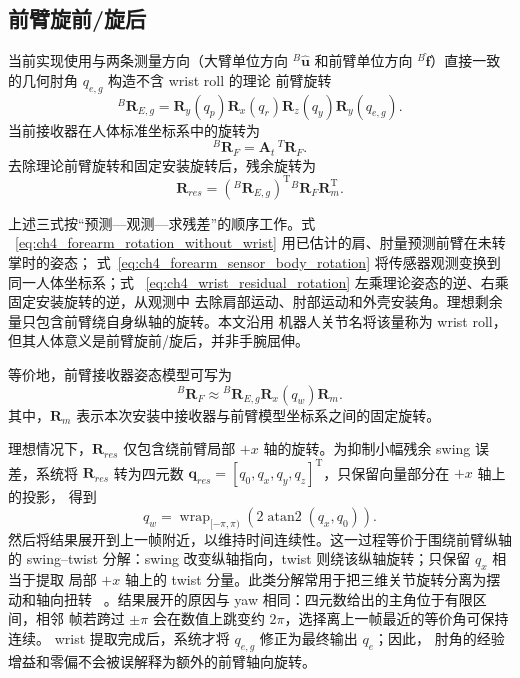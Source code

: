 \subsection{前臂旋前/旋后}
\label{subsec:ch4_forearm_pronation_supination}

当前实现使用与两条测量方向（大臂单位方向 ${}^{B}\hat{\boldsymbol u}$ 和前臂单位方向
${}^{B}\hat{\boldsymbol f}$）直接一致的几何肘角 $q_{e,g}$ 构造不含 wrist roll 的理论
前臂旋转
\begin{equation}
  {}^{B}\boldsymbol R_{E,g}=
  \boldsymbol R_y(q_p)\boldsymbol R_x(q_r)
  \boldsymbol R_z(q_y)\boldsymbol R_y(q_{e,g}).
  \label{eq:ch4_forearm_rotation_without_wrist}
\end{equation}
当前接收器在人体标准坐标系中的旋转为
\begin{equation}
  {}^{B}\boldsymbol R_F=
  \boldsymbol A_t\,{}^{T}\boldsymbol R_F.
  \label{eq:ch4_forearm_sensor_body_rotation}
\end{equation}
去除理论前臂旋转和固定安装旋转后，残余旋转为
\begin{equation}
  \boldsymbol R_{res}=
  ({}^{B}\boldsymbol R_{E,g})^{\mathrm T}
  {}^{B}\boldsymbol R_F\boldsymbol R_m^{\mathrm T}.
  \label{eq:ch4_wrist_residual_rotation}
\end{equation}

上述三式按“预测---观测---求残差”的顺序工作。式
~\eqref{eq:ch4_forearm_rotation_without_wrist} 用已估计的肩、肘量预测前臂在未转掌时的姿态；
式~\eqref{eq:ch4_forearm_sensor_body_rotation} 将传感器观测变换到同一人体坐标系；式
~\eqref{eq:ch4_wrist_residual_rotation} 左乘理论姿态的逆、右乘固定安装旋转的逆，从观测中
去除肩部运动、肘部运动和外壳安装角。理想剩余量只包含前臂绕自身纵轴的旋转。本文沿用
机器人关节名将该量称为 wrist roll，但其人体意义是前臂旋前/旋后，并非手腕屈伸。

等价地，前臂接收器姿态模型可写为
\begin{equation}
  {}^{B}\boldsymbol R_F
  \approx{}^{B}\boldsymbol R_{E,g}
  \boldsymbol R_x(q_w)\boldsymbol R_m.
  \label{eq:ch4_forearm_sensor_attitude_model}
\end{equation}
其中，$\boldsymbol R_m$ 表示本次安装中接收器与前臂模型坐标系之间的固定旋转。

理想情况下，$\boldsymbol R_{res}$ 仅包含绕前臂局部 $+x$ 轴的旋转。为抑制小幅残余 swing
误差，系统将 $\boldsymbol R_{res}$ 转为四元数
$\boldsymbol q_{res}=[q_0,q_x,q_y,q_z]^{\mathrm T}$，只保留向量部分在 $+x$ 轴上的投影，
得到
\begin{equation}
  q_w=\operatorname{wrap}_{[-\pi,\pi)}
  \left(2\operatorname{atan2}(q_x,q_0)\right).
  \label{eq:ch4_wrist_twist_angle}
\end{equation}
然后将结果展开到上一帧附近，以维持时间连续性。这一过程等价于围绕前臂纵轴的
swing--twist 分解：swing 改变纵轴指向，twist 则绕该纵轴旋转；只保留 $q_x$ 相当于提取
局部 $+x$ 轴上的 twist 分量。此类分解常用于把三维关节旋转分离为摆动和轴向扭转
~\cite{murthy2019joint}。结果展开的原因与 yaw 相同：四元数给出的主角位于有限区间，相邻
帧若跨过 $\pm\pi$ 会在数值上跳变约 $2\pi$，选择离上一帧最近的等价角可保持连续。
wrist 提取完成后，系统才将 $q_{e,g}$ 修正为最终输出 $q_e$；因此，
肘角的经验增益和零偏不会被误解释为额外的前臂轴向旋转。

